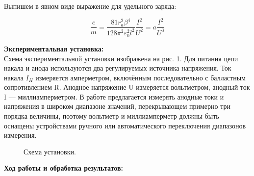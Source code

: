 \documentclass[a4paper, 12pt]{article}%
\begin{document}
	Выпишем в явном виде выражение для удельного заряда:
	
	\begin{equation}
		\frac{e}{m} = \frac{81r_a^2\beta^4}{128\pi^2\varepsilon_0^2l^2}  \frac{I^2}{U^2} = a \frac{I^2}{U^3}
	\end{equation}
	
	\textbf{Экспериментальная установка: }\\
	
	Схема экспериментальной установки изображена на рис. 1. Для питания цепи накала и анода используются два регулируемых источника
	напряжения. Ток накала $I_H$ измеряется амперметром, включённым последовательно с балластным сопротивлением R. Анодное напряжение U
	измеряется вольтметром, анодный ток I — миллиамперметром. В работе
	предлагается измерять анодные токи и напряжения в широком диапазоне значений, перекрывающем примерно три порядка величины, поэтому вольтметр и миллиамперметр должны быть оснащены устройствами ручного или автоматического переключения диапазонов измерения.
	
	\begin{figure}[H]
		\caption{Схема установки.}
	\end{figure}
	
	\newpage
	
	\textbf{Ход работы и обработка результатов: }\\
	
\end{document}
